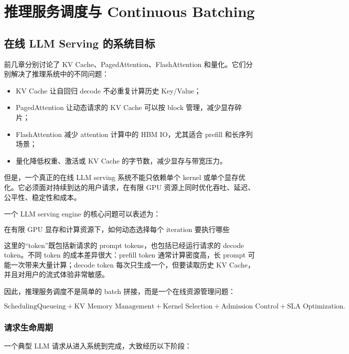 \chapter{推理服务调度与 Continuous Batching}
\label{chap:serving-scheduler-continuous-batching}

\section{在线 LLM Serving 的系统目标}
\label{sec:online-llm-serving-goals}

前几章分别讨论了 KV Cache、PagedAttention、FlashAttention 和量化。它们分别解决了推理系统中的不同问题：

\begin{itemize}
\item KV Cache 让自回归 decode 不必重复计算历史 Key/Value；
\item PagedAttention 让动态请求的 KV Cache 可以按 block 管理，减少显存碎片；
\item FlashAttention 减少 attention 计算中的 HBM IO，尤其适合 prefill 和长序列场景；
\item 量化降低权重、激活或 KV Cache 的字节数，减少显存与带宽压力。
\end{itemize}

但是，一个真正的在线 LLM serving 系统不能只依赖单个 kernel 或单个显存优化。它必须面对持续到达的用户请求，在有限 GPU 资源上同时优化吞吐、延迟、公平性、稳定性和成本。

一个 LLM serving engine 的核心问题可以表述为：

\[
\text{在有限 GPU 显存和计算资源下，如何动态选择每个 iteration 要执行哪些 token？}
\]

这里的“token”既包括新请求的 prompt tokens，也包括已经运行请求的 decode token。不同 token 的成本差异很大：prefill token 通常计算密度高，长 prompt 可能一次带来大量计算；decode token 每次只生成一个，但要读取历史 KV Cache，并且对用户的流式体验非常敏感。

因此，推理服务调度不是简单的 batch 拼接，而是一个在线资源管理问题：

\[
\text{Scheduling}
\text{Queueing}
+
\text{KV Memory Management}
+
\text{Kernel Selection}
+
\text{Admission Control}
+
\text{SLA Optimization}.
\]

\subsection{请求生命周期}
\label{subsec:serving-request-lifecycle}

一个典型 LLM 请求从进入系统到完成，大致经历以下阶段：

